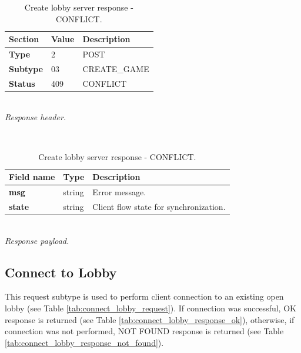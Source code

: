 \documentclass[english, sem, kiv, he, iso690alph, pdf, viewonly]{fasthesis}
\begin{document}
\begin{table}[h!]
	\centering
	\begin{minipage}[b]{1.0\textwidth}
		\centering
		\begin{tabular}{|l|l|l|}
			\hline
			\textbf{Section} & \textbf{Value} & \textbf{Description} \\ \hline
			\textbf{Type} & 2 & \footnotesize{POST} \\ \hline
			\textbf{Subtype} & 03 & \footnotesize{CREATE\_GAME}  \\ \hline
			\textbf{Status} & 409 & \footnotesize{CONFLICT} \\ \hline
		\end{tabular} \\
		\textit{Response header.}
	\end{minipage} 
	\\
	\vspace{10pt}
	\begin{minipage}[b]{1.0\textwidth}
		\centering
		\begin{tabular}{|l|l|l|}
			\hline
			\textbf{Field name} & \textbf{Type} & \textbf{Description} \\ \hline
			\textbf{msg} & string & Error message. \\ \hline
			\textbf{state} & string & Client flow state for synchronization. \\ \hline
		\end{tabular} \\
		\textit{Response payload.}
	\end{minipage}	
	\caption{Create lobby server response - CONFLICT.}
	\label{tab:create_lobby_request_conflict}
\end{table}

\newpage

\subsection{Connect to Lobby}

This request subtype is used to perform client connection to an existing open lobby (see Table \ref{tab:connect_lobby_request}). If connection was successful, OK response is returned (see Table \ref{tab:connect_lobby_response_ok}), otherwise, if connection was not performed, NOT FOUND response is returned (see Table \ref{tab:connect_lobby_response_not_found}).
\end{document}
